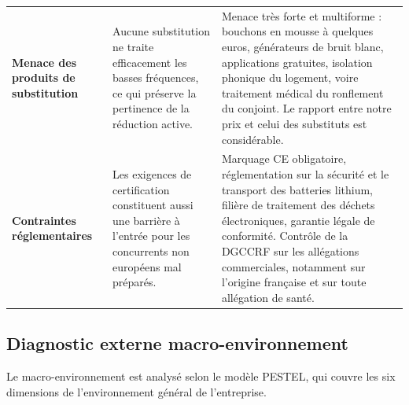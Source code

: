 \begin{center}
\begin{xltabular}{\textwidth}{P{3.2cm}LL}
\textbf{Menace des produits de substitution}
&
Aucune substitution ne traite efficacement les basses fréquences, ce qui
préserve la pertinence de la réduction active.
&
Menace très forte et multiforme : bouchons en mousse à quelques euros,
générateurs de bruit blanc, applications gratuites, isolation phonique du
logement, voire traitement médical du ronflement du conjoint. Le rapport entre
notre prix et celui des substituts est considérable. \\

\textbf{Contraintes réglementaires}
&
Les exigences de certification constituent aussi une barrière à l'entrée pour
les concurrents non européens mal préparés.
&
Marquage CE obligatoire, réglementation sur la sécurité et le transport des
batteries lithium, filière de traitement des déchets électroniques, garantie
légale de conformité. Contrôle de la DGCCRF sur les allégations commerciales,
notamment sur l'origine française et sur toute allégation de santé. \\
\bottomrule
\end{xltabular}
\end{center}

\clearpage
\subsection{Diagnostic externe \textendash{} macro-environnement}

Le macro-environnement est analysé selon le modèle PESTEL, qui couvre les six
dimensions de l'environnement général de l'entreprise.

